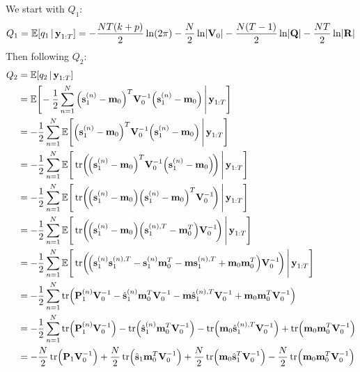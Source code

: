 	We start with \(Q_1\):
	\begin{equation*}
		Q_1 = \mathbb{E}[q_1 \,\vert\, \boldsymbol{\mathrm{y}}_{1:T}] = -\frac{NT(k + p)}{2} \ln(2\pi) - \frac{N}{2} \ln \lvert \boldsymbol{\mathrm{V}}_0 \rvert - \frac{N(T - 1)}{2} \ln \lvert \boldsymbol{\mathrm{Q}} \rvert - \frac{NT}{2} \ln \lvert \boldsymbol{\mathrm{R}} \rvert
	\end{equation*}
	Then following \(Q_2\):
	\begin{align*}
		Q_2
			&= \E[q_2 \given \vec{y}_{1:T}] \\
			&= \E\Bigg[\! -\frac{1}{2} \sum_{n = 1}^{N} \Big( \vec{s}_1^{(n)} - \vec{m}_0 \Big)^T \mat{V}_0^{-1} \Big( \vec{s}_1^{(n)} - \vec{m}_0 \Big) \Bigggiven \vec{y}_{1:T} \Bigg] \\
			&= -\frac{1}{2} \sum_{n = 1}^{N} \E\Bigg[ \Big( \vec{s}_1^{(n)} - \vec{m}_0 \Big)^T \mat{V}_0^{-1} \Big( \vec{s}_1^{(n)} - \vec{m}_0 \Big) \Bigggiven \vec{y}_{1:T} \Bigg] \\
			&= -\frac{1}{2} \sum_{n = 1}^{N} \E\Bigg[ \tr\!\bigg(\!\Big( \vec{s}_1^{(n)} - \vec{m}_0 \Big)^T \mat{V}_0^{-1} \Big( \vec{s}_1^{(n)} - \vec{m}_0 \Big)\!\bigg) \Bigggiven \vec{y}_{1:T} \Bigg] \\
			&= -\frac{1}{2} \sum_{n = 1}^{N} \E\Bigg[ \tr\!\bigg(\!\Big( \vec{s}_1^{(n)} - \vec{m}_0 \Big) \Big( \vec{s}_1^{(n)} - \vec{m}_0 \Big)^T \mat{V}_0^{-1} \!\bigg) \Bigggiven \vec{y}_{1:T} \Bigg] \\
			&= -\frac{1}{2} \sum_{n = 1}^{N} \E\Bigg[ \tr\!\bigg(\!\Big( \vec{s}_1^{(n)} - \vec{m}_0 \Big) \Big( \vec{s}_1^{(n), T} - \vec{m}_0^T \Big) \mat{V}_0^{-1} \!\bigg) \Bigggiven \vec{y}_{1:T} \Bigg] \\
			&= -\frac{1}{2} \sum_{n = 1}^{N} \E\Bigg[ \tr\!\bigg(\! \Big( \vec{s}_1^{(n)} \vec{s}_1^{(n), T} - \vec{s}_1^{(n)} \vec{m}_0^T - \vec{m} \vec{s}_1^{(n), T} + \vec{m}_0 \vec{m}_0^T \Big) \mat{V}_0^{-1} \!\bigg) \Bigggiven \vec{y}_{1:T} \Bigg] \\
			&= -\frac{1}{2} \sum_{n = 1}^{N} \tr\!\Big( \mat{P}_1^{(n)} \mat{V}_0^{-1} - \hat{\vec{s}}_1^{(n)} \vec{m}_0^T \mat{V}_0^{-1} - \vec{m} \hat{\vec{s}}_1^{(n), T} \mat{V}_0^{-1} + \vec{m}_0 \vec{m}_0^T \mat{V}_0^{-1} \Big) \\
			&= -\frac{1}{2} \sum_{n = 1}^{N} \tr\!\Big( \mat{P}_1^{(n)} \mat{V}_0^{-1} \Big) - \tr\!\Big( \hat{\vec{s}}_1^{(n)} \vec{m}_0^T \mat{V}_0^{-1} \Big) - \tr\!\Big( \vec{m}_0 \hat{\vec{s}}_1^{(n), T} \mat{V}_0^{-1} \Big) + \tr\!\Big(\vec{m}_0 \vec{m}_0^T \mat{V}_0^{-1} \Big) \\
			&=  -\frac{N}{2} \tr\!\Big( \mat{P}_1 \mat{V}_0^{-1} \Big) + \frac{N}{2} \tr\!\Big( \hat{\vec{s}}_1 \vec{m}_0^T \mat{V}_0^{-1} \Big) + \frac{N}{2} \tr\!\Big( \vec{m}_0 \hat{\vec{s}}_1^T \mat{V}_0^{-1} \Big) - \frac{N}{2} \tr\!\Big(\vec{m}_0 \vec{m}_0^T \mat{V}_0^{-1} \Big)
	\end{align*}
